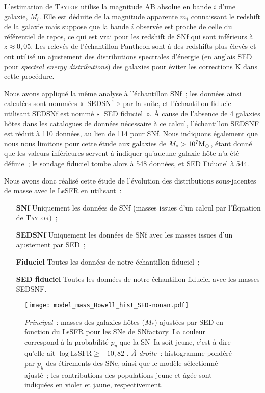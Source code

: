 \documentclass[../main/main.tex]{subfiles}
\begin{document}
L'estimation de \textsc{Taylor} utilise la magnitude AB absolue en bande $i$
d'une galaxie, $M_i$. Elle est déduite de la magnitude apparente $m_i$
connaissant le redshift de la galaxie mais suppose que la bande $i$ observée est
proche de celle du référentiel de repos, ce qui est vrai pour les redshift de
SNf qui sont inférieurs à $z\approx 0,05$. Les relevés de l'échantillon Pantheon
sont à des redshifts plus élevés et ont utilisé un ajustement des distributions
spectrales d'énergie (en anglais SED pour \textit{spectral energy
distributions}) des galaxies pour éviter les corrections K dans cette procédure.

Nous avons appliqué la même analyse à l'échantillon SNf~; les données ainsi
calculées sont nommées «~SEDSNf~» par la suite, et l'échantillon fiduciel
utilisant SEDSNf est nommé «~SED fiduciel~». À cause de l'absence de 4 galaxies
hôtes dans les catalogues de données nécessaire à ce calcul, l'échantillon
SEDSNF est réduit à 110 données, au lien de 114 pour SNf. Nous indiquons
également que nous nous limitons pour cette étude aux galaxies de $M_* >
10^7\si{\Msun}$, étant donné que les valeurs inférieures servent à indiquer
qu'aucune galaxie hôte n'a été définie~; le sondage fiduciel tombe alors à 548
données, et SED Fiduciel à 544.

Nous avons donc réalisé cette étude de l'évolution des distributions
sous-jacentes de masse avec le LsSFR en utilisant~:
\begin{enumerate}
    \item [\bfseries SNf] Uniquement les données de SNf (masses issues d'un
        calcul par l'Équation de \textsc{Taylor})~;
    \item [\bfseries SEDSNf] Uniquement les données de SNf avec les masses
        issues d'un ajustement par SED~;
    \item [\bfseries Fiduciel] Toutes les données de notre échantillon
        fiduciel~;
    \item [\bfseries SED fiduciel] Toutes les données de notre échantillon
        fiduciel avec les masses SEDSNF.
\end{enumerate}

\begin{figure}[t]
    \centering
    \texttt{[image: model\_mass\_Howell\_hist\_SED-nonan.pdf]}
    \caption[$M_*$ en fonction du LsSFR des SNe~Ia de SNfactory et modèle de
    masse sélectionné ajusté]{\textit{Principal}~: masses des galaxies hôtes
        ($M_*$) ajustées par SED en fonction du LsSFR pour les SNe de SNfactory.
        La couleur correspond à la probabilité $p_y$ que la SN~Ia soit jeune,
        c'est-à-dire qu'elle ait $\log \mathrm{LsSFR} \geq -10,82$
        \citep[voir][et Chapitre~\ref{ch:stretch}]{rigault2020}. \textit{À
        droite}~: histogramme pondéré par $p_y$ des étirements des SNe, ainsi
        que le modèle sélectionné ajusté~; les contributions des populations
    jeune et âgée sont indiquées en violet et jaune, respectivement.}
    \label{fig:massmodel}
\end{figure}
\end{document}
